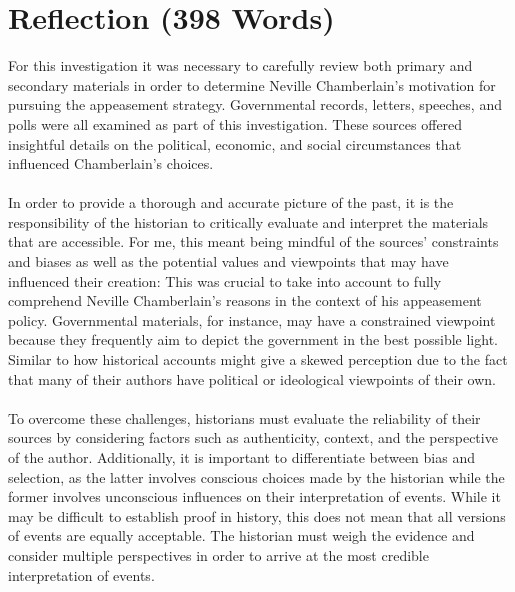 \documentclass[10pt, a4papert, hidelinks]{article}
\begin{document}
\section{Reflection (398 Words)}



For this investigation it was necessary to carefully review both primary and secondary materials in order to determine Neville Chamberlain's motivation for pursuing the appeasement strategy. Governmental records, letters, speeches, and polls were all examined as part of this investigation. These sources offered insightful details on the political, economic, and social circumstances that influenced Chamberlain's choices.\\\\
In order to provide a thorough and accurate picture of the past, it is the responsibility of the historian to critically evaluate and interpret the materials that are accessible. For me, this meant being mindful of the sources' constraints and biases as well as the potential values and viewpoints that may have influenced their creation: This was crucial to take into account to fully comprehend Neville Chamberlain's reasons in the context of his appeasement policy. Governmental materials, for instance, may have a constrained viewpoint because they frequently aim to depict the government in the best possible light. Similar to how historical accounts might give a skewed perception due to the fact that many of their authors have political or ideological viewpoints of their own.\\\\
To overcome these challenges, historians must evaluate the reliability of their sources by considering factors such as authenticity, context, and the perspective of the author. Additionally, it is important to differentiate between bias and selection, as the latter involves conscious choices made by the historian while the former involves unconscious influences on their interpretation of events. While it may be difficult to establish proof in history, this does not mean that all versions of events are equally acceptable. The historian must weigh the evidence and consider multiple perspectives in order to arrive at the most credible interpretation of events.\\\\
\end{document}
